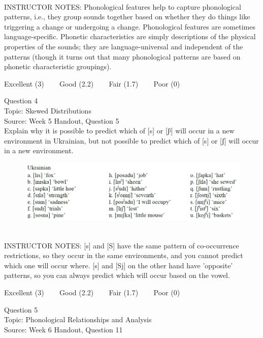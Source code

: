 \documentclass[12pt]{article}
\begin{document}
~\\
INSTRUCTOR NOTES: Phonological features help to capture phonological patterns, i.e., they group sounds together based on whether they do things like triggering a change or undergoing a change. Phonological features are sometimes language-specific. Phonetic characteristics are simply descriptions of the physical properties of the sounds; they are language-universal and independent of the patterns (though it turns out that many phonological patterns are based on phonetic characteristic groupings).


\vfill
Excellent (3) ~~~ Good (2.2) ~~~ Fair (1.7) ~~~ Poor (0)
\newpage

{\large Question 4}\\

Topic: Skewed Distributions\\
Source: Week 5 Handout, Question 5\\

Explain why it is possible to predict which of [s] or [ʃʲ] will occur in a new environment in Ukrainian, but not possible to predict which of [s] or [ʃ] will occur in a new environment.\\

\begin{figure}[H]
\includegraphics{../images/ukrainian.png}
\end{figure}

~\\
INSTRUCTOR NOTES: [s] and [S] have the same pattern of co-occurrence restrictions, so they occur in the same environments, and you cannot predict which one will occur where. [s] and [Sj] on the other hand have 'opposite' patterns, so you can always predict which will occur based on the vowel.


\vfill
Excellent (3) ~~~ Good (2.2) ~~~ Fair (1.7) ~~~ Poor (0)
\newpage

{\large Question 5}\\

Topic: Phonological Relationships and Analysis\\
Source: Week 6 Handout, Question 11\\
\end{document}
